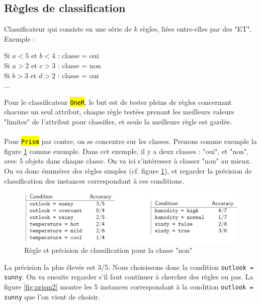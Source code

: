 \documentclass[letterpaper, 12pt]{article}
\newcommand{\alinea}{
\hspace*{0.5cm}}
\begin{document}
		\subsection{Règles de classification}
			\alinea Classificateur qui consiste en une série de $k$ 
				règles, liées entre-elles par des "ET".\\				
			\alinea Exemple :
				\begin{center}
					Si $a < 5$ et $b < 4$ : classe = oui\\
					Si $a > 2$ et $c > 3$ : classe = non\\
					Si $b > 3$ et $d > 2$ : classe = oui\\
					...
				\end{center}
			\alinea Pour le classificateur \hl{\texttt{OneR}}, le but est
				de tester pleins de règles concernant chacune un seul
				attribut, chaque règle testées prenant les meilleurs
				valeurs "limites" de l'attribut pour classifier, et seule
				la meilleure règle est gardée.\\
			~\\
			\alinea Pour \hl{\texttt{Prism}} par contre, on se concentre 
				sur les classes. Prenons comme exemple la figure 
				\ref{fig:prism} comme exemple. Dans cet exemple, il y 
				a deux classes : "oui", et "non", avec 5 objets dans 
				chaque classe. On va ici s'intéresser 
				à classer "non" au mieux. On va donc énumérer des
				règles simples (cf. figure \ref{fig:prism}), et 
				regarder la précision de classification des instances
				correspondant à ces conditions.
			\begin{figure}[H]
				\centering
				\includegraphics[scale=1.0]{Images/prism.png}
				\caption{Règle et précision de classification pour la classe
						 "non"}
				\label{fig:prism}
			\end{figure}\noindent
			\alinea La précision la plus élevée est 3/5. Nous choisissons
				donc la condition \texttt{outlook = sunny}. On va ensuite 
				regarder s'il faut continuer à chercher des règles ou pas.
				La figure \ref{fig:prism2} montre les 5 instances
				correspondant à la condition \texttt{outlook = sunny}
				que l'on vient de choisir.
\end{document}
